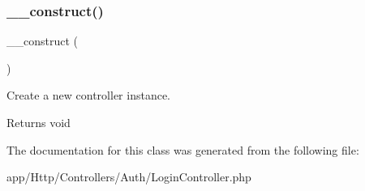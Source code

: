 \subsubsection{\texorpdfstring{\_\_construct()}{\_\_construct()}}
{\footnotesize\ttfamily \+\_\+\+\_\+construct (\begin{DoxyParamCaption}{ }\end{DoxyParamCaption})}

Create a new controller instance.

\begin{DoxyReturn}{Returns}
void 
\end{DoxyReturn}


The documentation for this class was generated from the following file\+:\begin{DoxyCompactItemize}
\item 
app/\+Http/\+Controllers/\+Auth/Login\+Controller.\+php\end{DoxyCompactItemize}
